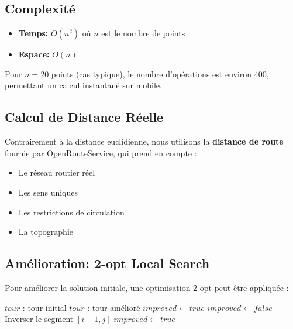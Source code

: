 \documentclass[12pt,a4paper]{report}
\begin{document}
\subsection{Complexité}

\begin{itemize}
    \item \textbf{Temps:} $O(n^2)$ où $n$ est le nombre de points
    \item \textbf{Espace:} $O(n)$
\end{itemize}

Pour $n = 20$ points (cas typique), le nombre d'opérations est environ 400, permettant un calcul instantané sur mobile.

\subsection{Calcul de Distance Réelle}

Contrairement à la distance euclidienne, nous utilisons la \textbf{distance de route} fournie par OpenRouteService, qui prend en compte :

\begin{itemize}
    \item Le réseau routier réel
    \item Les sens uniques
    \item Les restrictions de circulation
    \item La topographie
\end{itemize}

\subsection{Amélioration: 2-opt Local Search}

Pour améliorer la solution initiale, une optimisation 2-opt peut être appliquée :

\begin{algorithm}[H]
\caption{Amélioration 2-opt}
\begin{algorithmic}[1]
\Require $tour$ : tour initial
\Ensure $tour$ : tour amélioré
\State $improved \gets true$
    \State $improved \gets false$
                \State Inverser le segment $[i+1, j]$
                \State $improved \gets true$
            \EndIf
        \EndFor
    \EndFor
\EndWhile
\end{algorithmic}
\end{algorithm}
\end{document}
